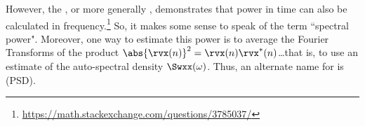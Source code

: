 However, the , or more generally  ,
demonstrates that power in time can also be calculated in frequency.\footnote{\url{https://math.stackexchange.com/questions/3785037/}}
So, it makes some sense to speak of the term ``spectral power".
Moreover, one way to estimate this power is to average the
Fourier Transforms of the product $\abs{\rvx(n)}^2=\rvx(n)\rvx^\ast(n)$\ldots that is, to use an estimate of
the auto-spectral density $\Swxx(\omega)$.
Thus, an alternate name for  is  (PSD).
